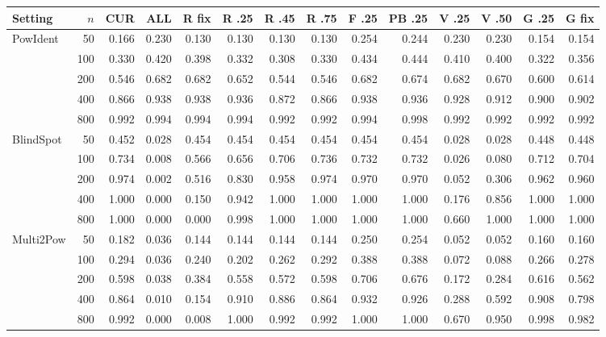 \begin{tabular}{@{}lrrrrrrrrrrrrr@{}}
\toprule
Setting & $n$ & CUR & ALL & R fix & R .25 & R .45 & R .75 & F .25 & PB .25 & V .25 & V .50 & G .25 & G fix\\
\midrule
PowIdent & 50 & 0.166 & 0.230 & 0.130 & 0.130 & 0.130 & 0.130 & 0.254 & 0.244 & 0.230 & 0.230 & 0.154 & 0.154\\
 & 100 & 0.330 & 0.420 & 0.398 & 0.332 & 0.308 & 0.330 & 0.434 & 0.444 & 0.410 & 0.400 & 0.322 & 0.356\\
 & 200 & 0.546 & 0.682 & 0.682 & 0.652 & 0.544 & 0.546 & 0.682 & 0.674 & 0.682 & 0.670 & 0.600 & 0.614\\
 & 400 & 0.866 & 0.938 & 0.938 & 0.936 & 0.872 & 0.866 & 0.938 & 0.936 & 0.928 & 0.912 & 0.900 & 0.902\\
 & 800 & 0.992 & 0.994 & 0.994 & 0.994 & 0.992 & 0.992 & 0.994 & 0.998 & 0.992 & 0.992 & 0.992 & 0.992\\
\addlinespace[2pt]
BlindSpot & 50 & 0.452 & 0.028 & 0.454 & 0.454 & 0.454 & 0.454 & 0.454 & 0.454 & 0.028 & 0.028 & 0.448 & 0.448\\
 & 100 & 0.734 & 0.008 & 0.566 & 0.656 & 0.706 & 0.736 & 0.732 & 0.732 & 0.026 & 0.080 & 0.712 & 0.704\\
 & 200 & 0.974 & 0.002 & 0.516 & 0.830 & 0.958 & 0.974 & 0.970 & 0.970 & 0.052 & 0.306 & 0.962 & 0.960\\
 & 400 & 1.000 & 0.000 & 0.150 & 0.942 & 1.000 & 1.000 & 1.000 & 1.000 & 0.176 & 0.856 & 1.000 & 1.000\\
 & 800 & 1.000 & 0.000 & 0.000 & 0.998 & 1.000 & 1.000 & 1.000 & 1.000 & 0.660 & 1.000 & 1.000 & 1.000\\
\addlinespace[2pt]
Multi2Pow & 50 & 0.182 & 0.036 & 0.144 & 0.144 & 0.144 & 0.144 & 0.250 & 0.254 & 0.052 & 0.052 & 0.160 & 0.160\\
 & 100 & 0.294 & 0.036 & 0.240 & 0.202 & 0.262 & 0.292 & 0.388 & 0.388 & 0.072 & 0.088 & 0.266 & 0.278\\
 & 200 & 0.598 & 0.038 & 0.384 & 0.558 & 0.572 & 0.598 & 0.706 & 0.676 & 0.172 & 0.284 & 0.616 & 0.562\\
 & 400 & 0.864 & 0.010 & 0.154 & 0.910 & 0.886 & 0.864 & 0.932 & 0.926 & 0.288 & 0.592 & 0.908 & 0.798\\
 & 800 & 0.992 & 0.000 & 0.008 & 1.000 & 0.992 & 0.992 & 1.000 & 1.000 & 0.670 & 0.950 & 0.998 & 0.982\\
\bottomrule
\end{tabular}